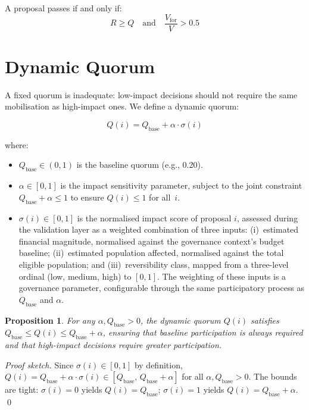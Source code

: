 \documentclass[12pt,a4paper,oneside]{report}
\newtheorem{proposition}{Proposition}[chapter]
\begin{document}
A proposal passes if and only if:
\begin{equation}
  \label{eq:pass}
  R \geq Q \quad \text{and} \quad \frac{V_{\text{for}}}{V} > 0.5
\end{equation}

\section{Dynamic Quorum}

A fixed quorum is inadequate: low-impact decisions should not require the same mobilisation as high-impact ones. We define a dynamic quorum:

\begin{equation}
  \label{eq:dynamic_quorum}
  Q(i) = Q_{\text{base}} + \alpha \cdot \sigma(i)
\end{equation}

where:
\begin{itemize}
  \item $Q_{\text{base}} \in (0, 1)$ is the baseline quorum (e.g., 0.20).
  \item $\alpha \in [0, 1]$ is the impact sensitivity parameter, subject to the joint constraint $Q_{\text{base}} + \alpha \leq 1$ to ensure $Q(i) \leq 1$ for all~$i$.
  \item $\sigma(i) \in [0, 1]$ is the normalised impact score of proposal $i$, assessed during the validation layer as a weighted combination of three inputs: (i)~estimated financial magnitude, normalised against the governance context's budget baseline; (ii)~estimated population affected, normalised against the total eligible population; and (iii)~reversibility class, mapped from a three-level ordinal (low, medium, high) to $[0, 1]$. The weighting of these inputs is a governance parameter, configurable through the same participatory process as $Q_{\text{base}}$ and $\alpha$.
\end{itemize}

\begin{proposition}
\label{prop:quorum}
For any $\alpha, Q_{\text{base}} > 0$, the dynamic quorum $Q(i)$ satisfies $Q_{\text{base}} \leq Q(i) \leq Q_{\text{base}} + \alpha$, ensuring that baseline participation is always required and that high-impact decisions require greater participation.
\end{proposition}

\begin{proof}[Proof sketch]
Since $\sigma(i) \in [0,1]$ by definition, $Q(i) = Q_{\text{base}} + \alpha\cdot\sigma(i) \in [Q_{\text{base}},\, Q_{\text{base}}+\alpha]$ for all $\alpha, Q_{\text{base}} > 0$. The bounds are tight: $\sigma(i)=0$ yields $Q(i)=Q_{\text{base}}$; $\sigma(i)=1$ yields $Q(i)=Q_{\text{base}}+\alpha$. \qed
\end{proof}
\end{document}
